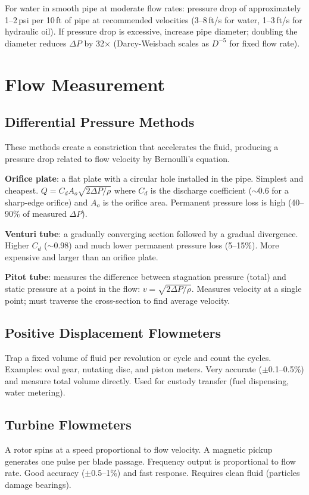 \documentclass[11pt,letterpaper,twoside,openany]{book}
\begin{document}
\begin{tipbox}
For water in smooth pipe at moderate flow rates: pressure drop of approximately 1--2\,psi per 10\,ft of pipe at recommended velocities (3--8\,ft/s for water, 1--3\,ft/s for hydraulic oil). If pressure drop is excessive, increase pipe diameter; doubling the diameter reduces $\Delta P$ by 32$\times$ (Darcy-Weisbach scales as $D^{-5}$ for fixed flow rate).
\end{tipbox}

\section{Flow Measurement}

\subsection{Differential Pressure Methods}
These methods create a constriction that accelerates the fluid, producing a pressure drop related to flow velocity by Bernoulli's equation.

\textbf{Orifice plate}: a flat plate with a circular hole installed in the pipe. Simplest and cheapest. $Q = C_d A_o \sqrt{2\Delta P/\rho}$ where $C_d$ is the discharge coefficient ($\sim$0.6 for a sharp-edge orifice) and $A_o$ is the orifice area. Permanent pressure loss is high (40--90\% of measured $\Delta P$).

\textbf{Venturi tube}: a gradually converging section followed by a gradual divergence. Higher $C_d$ ($\sim$0.98) and much lower permanent pressure loss (5--15\%). More expensive and larger than an orifice plate.

\textbf{Pitot tube}: measures the difference between stagnation pressure (total) and static pressure at a point in the flow: $v = \sqrt{2\Delta P/\rho}$. Measures velocity at a single point; must traverse the cross-section to find average velocity.

\subsection{Positive Displacement Flowmeters}
Trap a fixed volume of fluid per revolution or cycle and count the cycles. Examples: oval gear, nutating disc, and piston meters. Very accurate ($\pm$0.1--0.5\%) and measure total volume directly. Used for custody transfer (fuel dispensing, water metering).

\subsection{Turbine Flowmeters}
A rotor spins at a speed proportional to flow velocity. A magnetic pickup generates one pulse per blade passage. Frequency output is proportional to flow rate. Good accuracy ($\pm$0.5--1\%) and fast response. Requires clean fluid (particles damage bearings).
\end{document}
